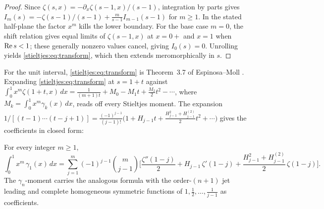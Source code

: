 \begin{proof}
Since $\zeta(s,x)=-\partial_x\zeta(s-1,x)/(s-1)$, integration by parts gives
$I_m(s)=-\zeta(s-1)/(s-1)+\tfrac{m}{s-1}I_{m-1}(s-1)$ for $m\ge1$.
In the stated half-plane the factor $x^m$ kills the lower boundary.
For the base case $m=0$, the shift relation gives equal limits of
$\zeta(s-1,x)$ at $x=0+$ and $x=1$ when $\operatorname{Re} s<1$; these
generally nonzero values cancel, giving $I_0(s)=0$. Unrolling yields
\eqref{stieltjes:eq:transform},
which then extends meromorphically in $s$.
\end{proof}

For the unit interval, \eqref{stieltjes:eq:transform} is Theorem~3.7 of
Espinosa--Moll \cite{stieltjes:EspinosaMoll1}. Expanding \eqref{stieltjes:eq:transform} at
$s=1+t$ against
$\int_0^1x^m\zeta(1+t,x)\,dx=\tfrac{1}{(m+1)t}+M_0-M_1t+\tfrac{M_2}{2}t^2-\cdots$,
where $M_k=\int_0^1x^m\gamma_k(x)\,dx$, reads off every Stieltjes moment.
The expansion
$1/[(t-1)\cdots(t-j+1)]=\tfrac{(-1)^{j-1}}{(j-1)!}\bigl(1+H_{j-1}t
+\tfrac{H_{j-1}^2+H_{j-1}^{(2)}}{2}t^2+\cdots\bigr)$
gives the coefficients in closed form:

\begin{theorem}\label{stieltjes:thm:moment}
For every integer $m\ge1$,
\[
\int_0^1 x^m\,\gamma_1(x)\,dx
=\sum_{j=1}^{m}(-1)^{j-1}\binom{m}{j-1}
\biggl[\frac{\zeta''(1-j)}{2}+H_{j-1}\,\zeta'(1-j)
+\frac{H_{j-1}^2+H_{j-1}^{(2)}}{2}\,\zeta(1-j)\biggr].
\]
The $\gamma_n$-moment carries the analogous formula with the order-$(n+1)$
jet leading and complete homogeneous symmetric functions of
$1,\tfrac12,\dots,\tfrac1{j-1}$ as coefficients.
\end{theorem}

